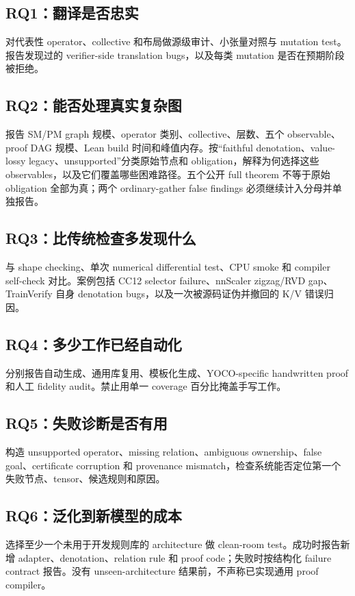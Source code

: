 \documentclass[11pt,a4paper]{ctexart}
\begin{document}
\subsection{RQ1：翻译是否忠实}
对代表性 operator、collective 和布局做源级审计、小张量对照与 mutation test。报告发现过的 verifier-side translation bugs，以及每类 mutation 是否在预期阶段被拒绝。

\subsection{RQ2：能否处理真实复杂图}
报告 SM/PM graph 规模、operator 类别、collective、层数、五个 observable、proof DAG 规模、Lean build 时间和峰值内存。按“faithful denotation、value-lossy legacy、unsupported”分类原始节点和 obligation，解释为何选择这些 observables，以及它们覆盖哪些困难路径。五个公开 full theorem 不等于原始 obligation 全部为真；两个 ordinary-gather false findings 必须继续计入分母并单独报告。

\subsection{RQ3：比传统检查多发现什么}
与 shape checking、单次 numerical differential test、CPU smoke 和 compiler self-check 对比。案例包括 CC12 selector failure、nnScaler zigzag/RVD gap、TrainVerify 自身 denotation bugs，以及一次被源码证伪并撤回的 K/V 错误归因。

\subsection{RQ4：多少工作已经自动化}
分别报告自动生成、通用库复用、模板化生成、YOCO-specific handwritten proof 和人工 fidelity audit。禁止用单一 coverage 百分比掩盖手写工作。

\subsection{RQ5：失败诊断是否有用}
构造 unsupported operator、missing relation、ambiguous ownership、false goal、certificate corruption 和 provenance mismatch，检查系统能否定位第一个失败节点、tensor、候选规则和原因。

\subsection{RQ6：泛化到新模型的成本}
选择至少一个未用于开发规则库的 architecture 做 clean-room test。成功时报告新增 adapter、denotation、relation rule 和 proof code；失败时按结构化 failure contract 报告。没有 unseen-architecture 结果前，不声称已实现通用 proof compiler。
\end{document}
